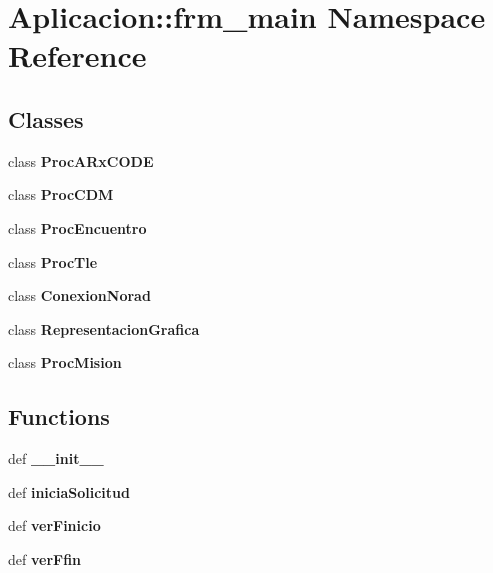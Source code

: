 \section{\-Aplicacion\-:\-:frm\-\_\-main \-Namespace \-Reference}
\label{namespace_aplicacion_1_1frm__main}
\subsection*{\-Classes}
\begin{DoxyCompactItemize}
\item 
class {\bf \-Proc\-A\-Rx\-C\-O\-D\-E}
\item 
class {\bf \-Proc\-C\-D\-M}
\item 
class {\bf \-Proc\-Encuentro}
\item 
class {\bf \-Proc\-Tle}
\item 
class {\bf \-Conexion\-Norad}
\item 
class {\bf \-Representacion\-Grafica}
\item 
class {\bf \-Proc\-Mision}
\end{DoxyCompactItemize}
\subsection*{\-Functions}
\begin{DoxyCompactItemize}
\item 
def {\bf \-\_\-\-\_\-init\-\_\-\-\_\-}
\item 
def {\bf inicia\-Solicitud}
\item 
def {\bf ver\-Finicio}
\item 
def {\bf ver\-Ffin}
\end{DoxyCompactItemize}
